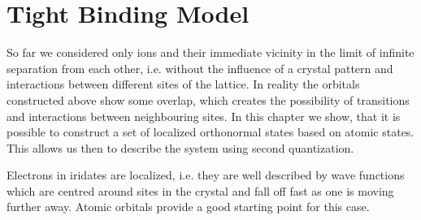 


\section{Tight Binding Model} %

So far we considered only ions and their immediate vicinity in the limit of infinite separation from each other, 
i.e. without the influence of a crystal pattern and interactions between different sites of the lattice.
In reality the orbitals constructed above show some overlap, which creates the possibility of transitions and interactions between neighbouring sites.
In this chapter we show, that it is possible to construct a set of localized orthonormal states based on atomic states. 
This allows us then to describe the system using second quantization.




Electrons in iridates are localized, i.e. they are well described by wave functions
which are centred around sites in the crystal and fall off fast as one is moving further away. 
Atomic orbitals provide a good starting point for this case.


